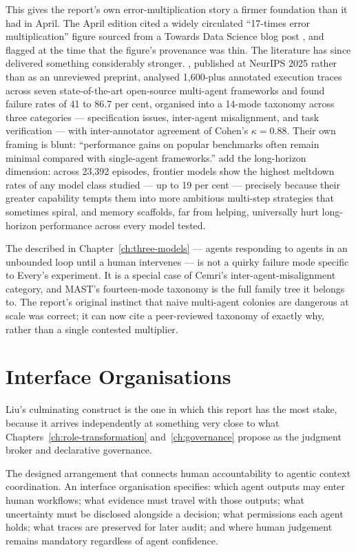 This gives the report's own error-multiplication story a firmer foundation than it had in April. The April edition cited a widely circulated ``17-times error multiplication'' figure sourced from a Towards Data Science blog post \parencite{TDS2026}, and flagged at the time that the figure's provenance was thin. The literature has since delivered something considerably stronger. \textcite{Cemri2025}, published at NeurIPS 2025 rather than as an unreviewed preprint, analysed 1,600-plus annotated execution traces across seven state-of-the-art open-source multi-agent frameworks and found failure rates of 41 to 86.7 per cent, organised into a 14-mode taxonomy across three categories --- specification issues, inter-agent misalignment, and task verification --- with inter-annotator agreement of Cohen's $\kappa = 0.88$. Their own framing is blunt: ``performance gains on popular benchmarks often remain minimal compared with single-agent frameworks.'' \textcite{Khanal2026} add the long-horizon dimension: across 23,392 episodes, frontier models show the highest meltdown rates of any model class studied --- up to 19 per cent --- precisely because their greater capability tempts them into more ambitious multi-step strategies that sometimes spiral, and memory scaffolds, far from helping, universally hurt long-horizon performance across every model tested.

The  described in Chapter~\ref{ch:three-models} --- agents responding to agents in an unbounded loop until a human intervenes --- is not a quirky failure mode specific to Every's experiment. It is a special case of Cemri's inter-agent-misalignment category, and MAST's fourteen-mode taxonomy is the full family tree it belongs to. The report's original instinct that naive multi-agent colonies are dangerous at scale was correct; it can now cite a peer-reviewed taxonomy of exactly why, rather than a single contested multiplier.

\section{Interface Organisations}

Liu's culminating construct is the one in which this report has the most stake, because it arrives independently at something very close to what Chapters~\ref{ch:role-transformation} and~\ref{ch:governance} propose as the judgment broker and declarative governance.

\begin{definitionbox}[title={Interface Organisation}]
The designed arrangement that connects human accountability to agentic context coordination. An interface organisation specifies: which agent outputs may enter human workflows; what evidence must travel with those outputs; what uncertainty must be disclosed alongside a decision; what permissions each agent holds; what traces are preserved for later audit; and where human judgement remains mandatory regardless of agent confidence.
\end{definitionbox}

